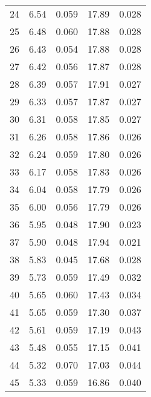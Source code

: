 \begin{table}
\begin{tabular}{c|ll|ll}
24 & 6.54 & 0.059 & 17.89 & 0.028 \\
25 & 6.48 & 0.060 & 17.88 & 0.028 \\
26 & 6.43 & 0.054 & 17.88 & 0.028 \\
27 & 6.42 & 0.056 & 17.87 & 0.028 \\
28 & 6.39 & 0.057 & 17.91 & 0.027 \\
29 & 6.33 & 0.057 & 17.87 & 0.027 \\
30 & 6.31 & 0.058 & 17.85 & 0.027 \\
31 & 6.26 & 0.058 & 17.86 & 0.026 \\
32 & 6.24 & 0.059 & 17.80 & 0.026 \\
33 & 6.17 & 0.058 & 17.83 & 0.026 \\
34 & 6.04 & 0.058 & 17.79 & 0.026 \\
35 & 6.00 & 0.056 & 17.79 & 0.026 \\
36 & 5.95 & 0.048 & 17.90 & 0.023 \\
37 & 5.90 & 0.048 & 17.94 & 0.021 \\
38 & 5.83 & 0.045 & 17.68 & 0.028 \\
39 & 5.73 & 0.059 & 17.49 & 0.032 \\
40 & 5.65 & 0.060 & 17.43 & 0.034 \\
41 & 5.65 & 0.059 & 17.30 & 0.037 \\
42 & 5.61 & 0.059 & 17.19 & 0.043 \\
43 & 5.48 & 0.055 & 17.15 & 0.041 \\
44 & 5.32 & 0.070 & 17.03 & 0.044 \\
45 & 5.33 & 0.059 & 16.86 & 0.040 \\
               \hline
        \end{tabular}
    \end{table}
    \clearpage

